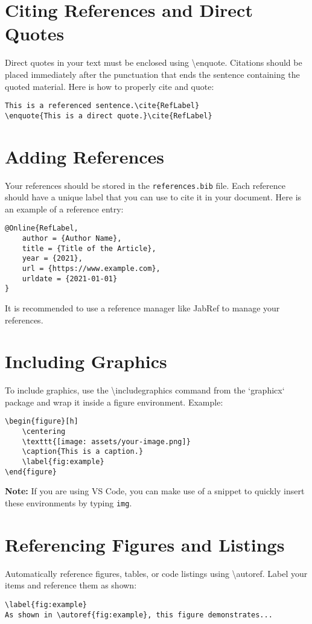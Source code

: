 \section{Citing References and Direct Quotes}
Direct quotes in your text must be enclosed using \textbackslash enquote{}. Citations should be placed immediately after the punctuation that ends the sentence containing the quoted material. Here is how to properly cite and quote:
\begin{verbatim}
This is a referenced sentence.\cite{RefLabel}
\enquote{This is a direct quote.}\cite{RefLabel}
\end{verbatim}

\section{Adding References}
Your references should be stored in the \texttt{references.bib} file. Each reference should have a unique label that you can use to cite it in your document. Here is an example of a reference entry:
\begin{verbatim}
@Online{RefLabel,
    author = {Author Name},
    title = {Title of the Article},
    year = {2021},
    url = {https://www.example.com},
    urldate = {2021-01-01}
}
\end{verbatim}

It is recommended to use a reference manager like JabRef to manage your references.

\section{Including Graphics}
To include graphics, use the \textbackslash includegraphics command from the `graphicx` package and wrap it inside a figure environment. Example:
\begin{verbatim}
\begin{figure}[h]
    \centering
    \texttt{[image: assets/your-image.png]}
    \caption{This is a caption.}
    \label{fig:example}
\end{figure}
\end{verbatim}

\textbf{Note:} If you are using VS Code, you can make use of a snippet to quickly insert these environments by typing \texttt{img}.


\section{Referencing Figures and Listings}
Automatically reference figures, tables, or code listings using \textbackslash autoref. Label your items and reference them as shown:
\begin{verbatim}
\label{fig:example}
As shown in \autoref{fig:example}, this figure demonstrates...
\end{verbatim}


